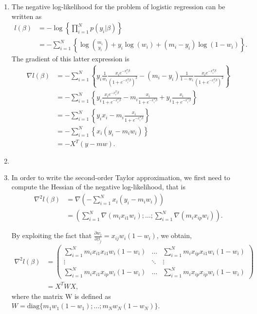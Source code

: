 \documentclass{jhwhw}
\begin{document}

\begin{enumerate}[label=(\Alph*)]
\item The negative log-likelihood for the problem of logistic regression can be written as
\begin{align*}
l(\beta) &= - \log\left\lbrace \prod_{i=1}^N p(y_i | \beta) \right\rbrace
\\
&= -\sum_{i=1}^N \left\lbrace \log \binom{m_i}{y_i} + y_i \log(w_i) + (m_i - y_i) \log (1 - w_i) \right\rbrace.
\end{align*}
The gradient of this latter expression is 
\begin{align*}
\nabla l(\beta) &= - \sum_{i=1}^N \left\lbrace y_i \frac{1}{w_i} \frac{x_i e^{-x_i^T \beta}}{(1+e^{-x_i^T \beta})^2} - (m_i - y_i) \frac{1}{1-w_i} \frac{x_i e^{-x_i^T \beta}}{(1+e^{-x_i^T \beta})^2} \right\rbrace
\\
&= - \sum_{i=1}^N \left\lbrace y_i \frac{x_i e^{-x_i^T \beta}}{1+e^{-x_i^T \beta}} - m_i \frac{x_i}{1+e^{-x_i^T \beta}} + y_i \frac{x_i}{1+e^{-x_i^T \beta}} \right\rbrace
\\
&= - \sum_{i=1}^N \left\lbrace y_i x_i - m_i \frac{x_i}{1+e^{-x_i^T \beta}} \right\rbrace
\\
&= - \sum_{i=1}^N \left\lbrace x_i (y_i - m_i w_i) \right\rbrace
\\
&= -X^T (y - mw).
\end{align*}

\item

\item In order to write the second-order Taylor approximation, we first need to compute the Hessian of the negative log-likelihood, that is
\begin{align*}
\nabla^2 l(\beta) &= \nabla \left( - \sum_{i=1}^N x_i (y_i - m_i w_i) \right)
\\
&= \left( \sum_{i=1}^N \nabla (m_i x_{i1} w_i); \dots ; \sum_{i=1}^N \nabla (m_i x_{ip} w_i) \right).
\end{align*}

By exploiting the fact that $\frac{\partial w_i}{\partial \beta_j} = x_{ij} w_i (1 - w_i)$, we obtain, 
\begin{align*}
\nabla^2 l(\beta) &= \left( \begin{array}{ccc}
\sum_{i=1}^N m_i x_{i1} x_{i1} w_i (1 - w_i) & \hdots & \sum_{i=1}^N m_i x_{ip} x_{i1} w_i (1 - w_i) \\ 
\vdots & \ddots & \vdots \\ 
\sum_{i=1}^N m_i x_{i1} x_{ip} w_i (1 - w_i) & \hdots & \sum_{i=1}^N m_i x_{ip} x_{ip} w_i (1 - w_i)
\end{array} 
\right)
\\
&= X^T W X, 
\end{align*}
where the matrix W is defined as $W = \text{diag} \{ m_1 w_1 (1-w_1); \dots ; m_N w_N (1-w_N) \}$. 


\end{enumerate}
\end{document}
